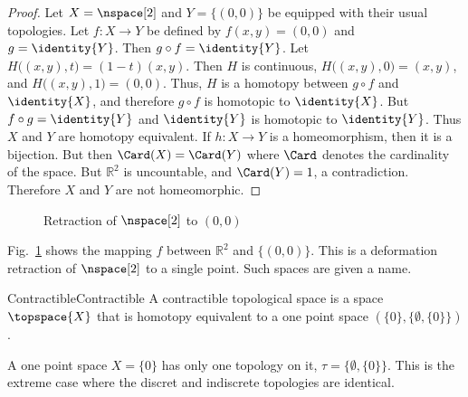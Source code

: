 \documentclass[oneside]{book}                                                  %
\begin{document}
                \begin{proof}
                    Let $X=\nspace[2]$ and $Y=\{(0,0)\}$ be equipped with their
                    usual topologies. Let $f:X\rightarrow{Y}$ be defined by
                    $f(x,y)=(0,0)$ and $g=\identity{Y}$. Then
                    $g\circ{f}=\identity{Y}$. Let
                    $H\big((x,y),t\big)=(1-t)(x,y)$. Then $H$ is continuous,
                    $H\big((x,y),0\big)=(x,y)$, and $H\big((x,y),1\big)=(0,0)$.
                    Thus, $H$ is a homotopy between ${g}\circ{f}$ and
                    $\identity{X}$, and therefore ${g}\circ{f}$ is homotopic to
                    $\identity{X}$. But ${f}\circ{g}=\identity{Y}$ and
                    $\identity{Y}$ is homotopic to $\identity{Y}$. Thus $X$ and
                    $Y$ are homotopy equivalent. If $h:{X}\rightarrow{Y}$ is a
                    homeomorphism, then it is a bijection. But then
                    $\Card(X)=\Card(Y)$ where $\Card$ denotes the cardinality
                    of the space. But $\mathbb{R}^{2}$ is uncountable, and
                    $\Card(Y)=1$, a contradiction. Therefore $X$ and $Y$ are not
                    homeomorphic.
                \end{proof}
                \begin{figure}[H]
                    \captionsetup{type=figure}
                    \centering
                    
                    \caption{Retraction of $\nspace[2]$ to $(0,0)$}
                    \label{fig:homotopy_equivalence_of_plane_with_point}
                \end{figure}
                Fig.~\ref{fig:homotopy_equivalence_of_plane_with_point}
                shows the mapping $f$ between $\mathbb{R}^{2}$ and $\{(0,0)\}$.
                This is a deformation retraction of $\nspace[2]$ to a single
                point. Such spaces are given a name.
                \begin{fdefinition}{Contractible}{Contractible}
                    A contractible topological space is a space $\topspace{X}$
                    that is homotopy equivalent to a one point space
                    $(\{0\},\{\emptyset,\{0\}\})$.
                \end{fdefinition}
                A one point space $X=\{0\}$ has only one topology on it,
                $\tau=\{\emptyset,\{0\}\}$. This is the extreme case where the
                discret and indiscrete topologies are identical.
                \par\hfill\par
\end{document}
